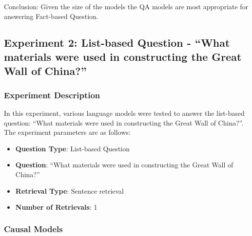 \documentclass{wseas}
\begin{document}
Conclusion: Given the size of the models the QA models are most
appropriate for answering Fact-based Question.


\subsection{Experiment 2: List-based Question - ``What materials were
used in constructing the Great Wall of
China?''}

\subsubsection{Experiment Description}

In this experiment, various language models were tested to answer the
list-based question: ``What materials were used in constructing the
Great Wall of China?''. The experiment parameters are as follows:

\begin{itemize}

\item
  \textbf{Question Type}: List-based Question
\item
  \textbf{Question}: ``What materials were used in constructing the
  Great Wall of China?''
\item
  \textbf{Retrieval Type}: Sentence retrieval
\item
  \textbf{Number of Retrievals}: 1
\end{itemize}

\subsubsection{Causal Models}

\end{document}
